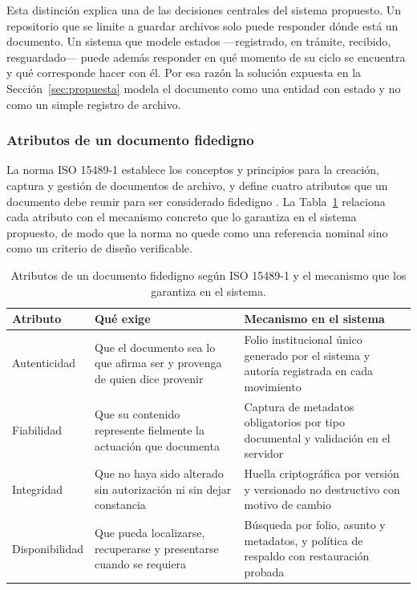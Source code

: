 Esta distinción explica una de las decisiones centrales del sistema propuesto. Un repositorio que se limite a guardar archivos solo puede responder dónde está un documento. Un sistema que modele estados —registrado, en trámite, recibido, resguardado— puede además responder en qué momento de su ciclo se encuentra y qué corresponde hacer con él. Por esa razón la solución expuesta en la Sección~\ref{sec:propuesta} modela el documento como una entidad con estado y no como un simple registro de archivo.

\subsubsection{Atributos de un documento fidedigno}

La norma ISO 15489-1 establece los conceptos y principios para la creación, captura y gestión de documentos de archivo, y define cuatro atributos que un documento debe reunir para ser considerado fidedigno \cite{iso15489}. La Tabla~\ref{tab:atributos_iso} relaciona cada atributo con el mecanismo concreto que lo garantiza en el sistema propuesto, de modo que la norma no quede como una referencia nominal sino como un criterio de diseño verificable.

\begin{table}[H]
  \centering
  \small
  \renewcommand{\arraystretch}{1.3}
  \caption{Atributos de un documento fidedigno según ISO 15489-1 y el mecanismo que los garantiza en el sistema.}
  \label{tab:atributos_iso}
  \begin{tabularx}{\textwidth}{@{}>{\raggedright\arraybackslash}p{2.6cm}>{\raggedright\arraybackslash}X>{\raggedright\arraybackslash}X@{}}
    \toprule
    \textbf{Atributo} & \textbf{Qué exige} & \textbf{Mecanismo en el sistema} \\
    \midrule
    Autenticidad & Que el documento sea lo que afirma ser y provenga de quien dice provenir & Folio institucional único generado por el sistema y autoría registrada en cada movimiento \\
    Fiabilidad & Que su contenido represente fielmente la actuación que documenta & Captura de metadatos obligatorios por tipo documental y validación en el servidor \\
    Integridad & Que no haya sido alterado sin autorización ni sin dejar constancia & Huella criptográfica por versión y versionado no destructivo con motivo de cambio \\
    Disponibilidad & Que pueda localizarse, recuperarse y presentarse cuando se requiera & Búsqueda por folio, asunto y metadatos, y política de respaldo con restauración probada \\
    \bottomrule
  \end{tabularx}
\end{table}

